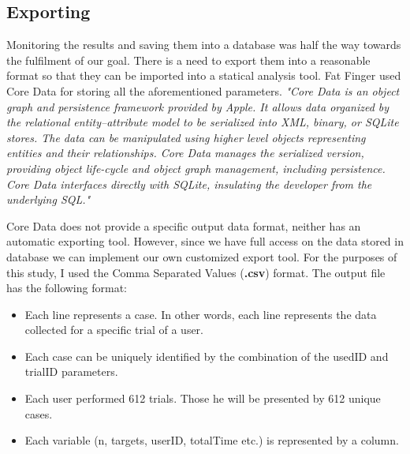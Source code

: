 \subsection{Exporting}
\label{sec:exporting}

Monitoring the results and saving them into a database was half the way towards the fulfilment of our goal. There is a need to export them into a reasonable format so that they can be imported into a statical analysis tool. Fat Finger used Core Data for storing all the aforementioned parameters.
\emph{"Core Data is an object graph and persistence framework provided by Apple. It allows data organized by the relational entity–attribute model to be serialized into XML, binary, or SQLite stores. The data can be manipulated using higher level objects representing entities and their relationships. Core Data manages the serialized version, providing object life-cycle and object graph management, including persistence. Core Data interfaces directly with SQLite, insulating the developer from the underlying SQL."} \cite{coreData}

Core Data does not provide a specific output data format, neither has an automatic exporting tool. However, since we have full access on the data stored in database we can implement our own customized export tool. For the purposes of this study, I used the Comma Separated Values (\textbf{.csv}) format. The output file has the following format:

\begin{itemize}
	\item Each line represents a case. In other words, each line represents the data collected for a specific trial of a user.
	\item Each case can be uniquely identified by the combination of the usedID and trialID parameters.
	\item Each user performed 612 trials. Those he will be presented by 612 unique cases.
	\item Each variable (n, targets, userID, totalTime etc.) is represented by a column.
\end{itemize}




